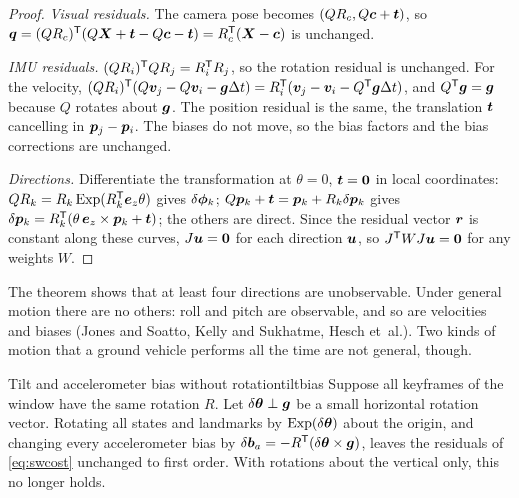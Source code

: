 \begin{proof}
\emph{Visual residuals.} The camera pose becomes $(QR_c,Q\bm{c}+
\bm{t})$, so $\bm{q}=(QR_c)^{\mathsf{T}}(Q\bm{X}+\bm{t}-Q\bm{c}-\bm{t})=
R_c^{\mathsf{T}}(\bm{X}-\bm{c})$ is unchanged.

\emph{IMU residuals.} $(QR_i)^{\mathsf{T}} QR_j=R_i^{\mathsf{T}} R_j$, so the rotation residual
is unchanged. For the velocity, $(QR_i)^{\mathsf{T}}(Q\bm{v}_j-Q\bm{v}_i-\bm{g}
\Delta t)=R_i^{\mathsf{T}}(\bm{v}_j-\bm{v}_i-Q^{\mathsf{T}}\bm{g}\Delta t)$, and $Q^{\mathsf{T}}
\bm{g}=\bm{g}$ because $Q$ rotates about $\bm{g}$. The position
residual is the same, the translation $\bm{t}$ cancelling in $\bm{p}_j-
\bm{p}_i$. The biases do not move, so the bias factors and the bias
corrections are unchanged.

\emph{Directions.} Differentiate the transformation at $\theta=0$,
$\bm{t}=\bm{0}$ in local coordinates: $QR_k=R_k\operatorname{Exp}(R_k^{\mathsf{T}}\bm{e}_z
\theta)$ gives $\delta\bm{\phi}_k$; $Q\bm{p}_k+\bm{t}=\bm{p}_k+R_k\delta\bm{p}_k$
gives $\delta\bm{p}_k=R_k^{\mathsf{T}}(\theta\,\bm{e}_z\times\bm{p}_k+\bm{t})$; the
others are direct. Since the residual vector $\bm{r}$ is constant
along these curves, $J\bm{u}=\bm{0}$ for each direction $\bm{u}$,
so $J^{\mathsf{T}} WJ\bm{u}=\bm{0}$ for any weights $W$.
\end{proof}

The theorem shows that at least four directions are unobservable.
Under general motion there are no others: roll and pitch are
observable, and so are velocities and biases (Jones and Soatto, Kelly
and Sukhatme, Hesch et~al.). Two kinds of motion that a ground vehicle
performs all the time are not general, though.

\begin{proposition}{Tilt and accelerometer bias without rotation}{tiltbias}
Suppose all keyframes of the window have the same rotation $R$. Let
$\delta\bm{\theta}\perp\bm{g}$ be a small horizontal rotation vector. Rotating
all states and landmarks by $\operatorname{Exp}(\delta\bm{\theta})$ about the origin, and
changing every accelerometer bias by $\delta\bm{b}_a=-R^{\mathsf{T}}(\delta\bm{\theta}
\times\bm{g})$, leaves the residuals of \eqref{eq:swcost} unchanged to
first order. With rotations about the vertical only, this no longer
holds.
\end{proposition}

